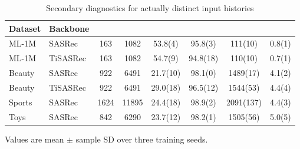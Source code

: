 \begin{table}[!htbp]
\centering
\caption{Secondary diagnostics for actually distinct input histories}
\label{tab:secondary}
\fontsize{8.5}{11}\selectfont
\setlength{\tabcolsep}{2.2pt}
\begin{tabular*}{\textwidth}{@{\extracolsep{\fill}}llS[table-format=4.0]S[table-format=5.0]S[table-format=2.1(3)]S[table-format=2.1(3)]S[table-format=4.0(4)]S[table-format=2.1(3)]@{}}
\toprule
Dataset & Backbone & {} & {} & {} & {} & {} & {}\\
\midrule
ML-1M & SASRec & 163 & 1082 & 53.8(4) & 95.8(3) & 111(10) & 0.8(1)\\ %
ML-1M & TiSASRec & 163 & 1082 & 54.7(9) & 94.8(18) & 110(10) & 0.7(1)\\ %
Beauty & SASRec & 922 & 6491 & 21.7(10) & 98.1(0) & 1489(17) & 4.1(2)\\ %
Beauty & TiSASRec & 922 & 6491 & 29.0(18) & 96.5(12) & 1544(53) & 4.4(4)\\ %
Sports & SASRec & 1624 & 11895 & 24.4(18) & 98.9(2) & 2091(137) & 4.4(3)\\ %
Toys & SASRec & 842 & 6290 & 23.7(12) & 98.2(1) & 1505(56) & 5.0(5)\\ %
\bottomrule
\end{tabular*}
\par\smallskip\noindent\begin{minipage}{\textwidth}\fontsize{8.5}{11}\selectfont Values are mean $\pm$ sample SD over three training seeds.
\end{minipage}
\end{table}
